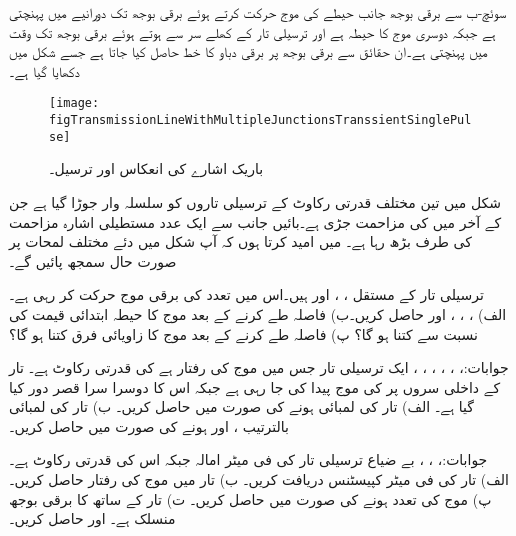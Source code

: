 سوئچ-ب سے برقی بوجھ جانب  حیطے کی موج حرکت کرتے ہوئے برقی بوجھ تک  دورانیے میں پہنچتی ہے جبکہ دوسری موج کا حیطہ  ہے اور ترسیلی تار کے کھلے سر سے ہوتے ہوئے برقی بوجھ تک  وقت میں پہنچتی ہے۔ان حقائق سے برقی بوجھ پر برقی دباو کا خط حاصل کیا جاتا ہے جسے شکل  میں دکھایا گیا ہے۔

\begin{figure}
\centering
\texttt{[image: figTransmissionLineWithMultipleJunctionsTranssientSinglePulse]}
\caption{باریک اشارے کی انعکاس اور ترسیل۔}
\label{شکل_ترسیلی_تار_باریک_اشارے_کی_انعکاس}
\end{figure}

شکل  میں تین مختلف قدرتی رکاوٹ کے ترسیلی تاروں کو سلسلہ وار جوڑا گیا ہے جن کے آخر میں  کی مزاحمت جڑی ہے۔بائیں جانب سے ایک عدد مستطیلی اشارہ مزاحمت کی طرف بڑھ رہا ہے۔ میں امید کرتا ہوں کہ آپ شکل میں دئے مختلف لمحات پر صورت حال سمجھ پائیں گے۔
\newpage
{}

ترسیلی تار کے مستقل ، ،  اور  ہیں۔اس میں  تعدد کی برقی موج حرکت کر رہی ہے۔ الف) ، ، ،  اور  حاصل کریں۔ب)   فاصلہ طے کرنے کے بعد موج کا حیطہ ابتدائی قیمت کی نسبت سے کتنا ہو گا؟ پ)  فاصلہ طے کرنے کے بعد موج کا زاویائی فرق کتنا ہو گا؟ 

جوابات:، ، ، ، ، ، 
ایک ترسیلی تار جس میں موج کی رفتار  ہے کی قدرتی رکاوٹ  ہے۔ تار کے داخلی سروں پر  کی موج پیدا کی جا رہی ہے جبکہ اس کا دوسرا سرا قصر دور کیا گیا ہے۔ الف) تار کی لمبائی  ہونے کی صورت میں  حاصل کریں۔ ب) تار کی لمبائی بالترتیب ،  اور  ہونے کی صورت میں  حاصل کریں۔

جوابات:، ، ،  
بے ضیاع ترسیلی تار کی فی میٹر امالہ  جبکہ اس کی قدرتی رکاوٹ  ہے۔الف) تار کی فی میٹر کپیسٹنس دریافت کریں۔ ب) تار میں موج کی رفتار حاصل کریں۔ پ) موج کی تعدد  ہونے کی صورت میں  حاصل کریں۔ ت) تار کے ساتھ  کا برقی بوجھ منسلک ہے۔  اور  حاصل کریں۔

